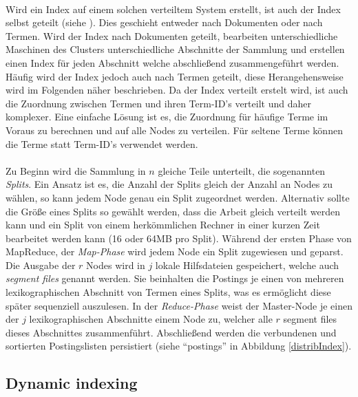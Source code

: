 \paragraph{}
Wird ein Index auf einem solchen verteiltem System erstellt, ist auch der Index selbst geteilt (siehe ). Dies geschieht entweder nach Dokumenten oder nach Termen. Wird der Index nach Dokumenten geteilt, bearbeiten unterschiedliche Maschinen des Clusters unterschiedliche Abschnitte der Sammlung und erstellen einen Index für jeden Abschnitt welche abschließend zusammengeführt werden. Häufig wird der Index jedoch auch nach Termen geteilt, diese Herangehensweise wird im Folgenden näher beschrieben. Da der Index verteilt erstelt wird, ist auch die Zuordnung zwischen Termen und ihren Term-ID's verteilt und daher komplexer. Eine einfache Lösung ist es, die Zuordnung für häufige Terme im Voraus zu berechnen und auf alle Nodes zu verteilen. Für seltene Terme können die Terme statt Term-ID's verwendet werden.\par

\paragraph{}
Zu Beginn wird die Sammlung in $n$ gleiche Teile unterteilt, die sogenannten \textit{Splits}. Ein Ansatz ist es, die Anzahl der Splits gleich der Anzahl an Nodes zu wählen, so kann jedem Node genau ein Split zugeordnet werden. Alternativ sollte die Größe eines Splits so gewählt werden, dass die Arbeit gleich verteilt werden kann und ein Split von einem herkömmlichen Rechner in einer kurzen Zeit bearbeitet werden kann (16 oder 64MB pro Split). Während der ersten Phase von MapReduce, der \textit{Map-Phase} wird jedem Node ein Split zugewiesen und geparst. Die Ausgabe der $r$ Nodes wird in $j$ lokale Hilfsdateien gespeichert, welche auch \textit{segment files} genannt werden. Sie beinhalten die Postings je einen von mehreren lexikographischen Abschnitt von Termen eines Splits, was es ermöglicht diese später sequenziell auszulesen. In der \textit{Reduce-Phase} weist der Master-Node je einen der $j$ lexikographischen Abschnitte einem Node zu, welcher alle $r$ segment files dieses Abschnittes zusammenführt. Abschließend werden die verbundenen und sortierten Postingslisten persistiert (siehe \enquote{postings} in Abbildung \ref{distribIndex}).\par

\subsection{Dynamic indexing}
